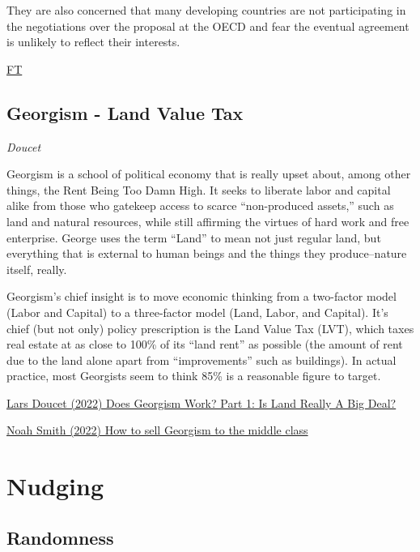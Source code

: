 \documentclass[
]{book}
\begin{document}
They are also concerned that many developing countries are not participating in the negotiations over the proposal at the OECD and fear the eventual agreement is unlikely to reflect their interests.

\href{https://www.ft.com/content/9f8304c5-5aad-4064-9218-54070981fb4d}{FT}

\hypertarget{georgism---land-value-tax}{%
\section{Georgism - Land Value Tax}\label{georgism---land-value-tax}}

\emph{Doucet}

Georgism is a school of political economy that is really upset about, among other things, the Rent Being Too Damn High. It seeks to liberate labor and capital alike from those who gatekeep access to scarce ``non-produced assets,'' such as land and natural resources, while still affirming the virtues of hard work and free enterprise. George uses the term ``Land'' to mean not just regular land, but everything that is external to human beings and the things they produce--nature itself, really.

Georgism's chief insight is to move economic thinking from a two-factor model (Labor and Capital) to a three-factor model (Land, Labor, and Capital). It's chief (but not only) policy prescription is the Land Value Tax (LVT), which taxes real estate at as close to 100\% of its ``land rent'' as possible (the amount of rent due to the land alone apart from ``improvements'' such as buildings). In actual practice, most Georgists seem to think 85\% is a reasonable figure to target.

\href{https://astralcodexten.substack.com/p/does-georgism-work-is-land-really}{Lars Doucet (2022) Does Georgism Work? Part 1: Is Land Really A Big Deal?}

\href{https://noahpinion.substack.com/p/how-to-sell-georgism-to-the-middle}{Noah Smith (2022) How to sell Georgism to the middle class}

\hypertarget{nudging}{%
\chapter{Nudging}\label{nudging}}

\hypertarget{randomness}{%
\section{Randomness}\label{randomness}}
\end{document}
